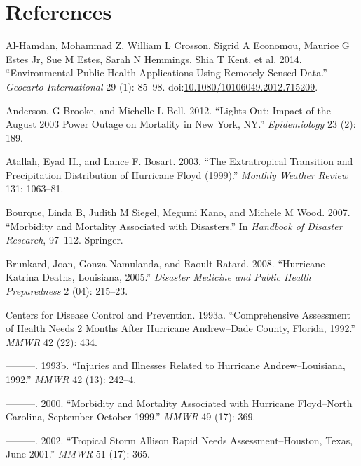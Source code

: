 \documentclass[]{elsarticle} %
\begin{document}
\section*{References}\label{references}

\hypertarget{refs}{}
\hypertarget{ref-AlHamdan2014}{}
Al-Hamdan, Mohammad Z, William L Crosson, Sigrid A Economou, Maurice G
Estes Jr, Sue M Estes, Sarah N Hemmings, Shia T Kent, et al. 2014.
``Environmental Public Health Applications Using Remotely Sensed Data.''
\emph{Geocarto International} 29 (1): 85--98.
doi:\href{https://doi.org/10.1080/10106049.2012.715209}{10.1080/10106049.2012.715209}.

\hypertarget{ref-Anderson2012}{}
Anderson, G Brooke, and Michelle L Bell. 2012. ``Lights Out: Impact of
the August 2003 Power Outage on Mortality in New York, NY.''
\emph{Epidemiology} 23 (2): 189.

\hypertarget{ref-Atallah2003}{}
Atallah, Eyad H., and Lance F. Bosart. 2003. ``The Extratropical
Transition and Precipitation Distribution of Hurricane Floyd (1999).''
\emph{Monthly Weather Review} 131: 1063--81.

\hypertarget{ref-Bourque2007}{}
Bourque, Linda B, Judith M Siegel, Megumi Kano, and Michele M Wood.
2007. ``Morbidity and Mortality Associated with Disasters.'' In
\emph{Handbook of Disaster Research}, 97--112. Springer.

\hypertarget{ref-Brunkard2008}{}
Brunkard, Joan, Gonza Namulanda, and Raoult Ratard. 2008. ``Hurricane
Katrina Deaths, Louisiana, 2005.'' \emph{Disaster Medicine and Public
Health Preparedness} 2 (04): 215--23.

\hypertarget{ref-Centers1993Andrew}{}
Centers for Disease Control and Prevention. 1993a. ``Comprehensive
Assessment of Health Needs 2 Months After Hurricane Andrew--Dade County,
Florida, 1992.'' \emph{MMWR} 42 (22): 434.

\hypertarget{ref-Centers1993Andrew2}{}
---------. 1993b. ``Injuries and Illnesses Related to Hurricane
Andrew--Louisiana, 1992.'' \emph{MMWR} 42 (13): 242--4.

\hypertarget{ref-Centers2000Floyd}{}
---------. 2000. ``Morbidity and Mortality Associated with Hurricane
Floyd--North Carolina, September-October 1999.'' \emph{MMWR} 49 (17):
369.

\hypertarget{ref-Centers2002Allison}{}
---------. 2002. ``Tropical Storm Allison Rapid Needs
Assessment--Houston, Texas, June 2001.'' \emph{MMWR} 51 (17): 365.
\end{document}
